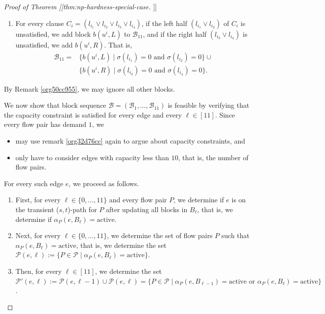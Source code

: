 \documentclass[fontsize=11pt,paper=a4]{book}
\begin{document}
\begin{proof}[Proof of Theorem [[thm:np-hardness-special-case]]]
\begin{enumerate}
\item For every clause \(C_i=(l_{i_1}\vee l_{i_2}\vee l_{i_3}\vee l_{i_4})\), if the left half \((l_{i_1}\vee l_{i_2})\) of \(C_i\) is unsatisfied, we add block \(b(u^i,L)\) to \(\mathscr{B}_{11}\), and if the right half \((l_{i_3}\vee l_{i_4})\) is unsatisfied, we add \(b(u^i,R)\).
That is,
\begin{align*}
\mathscr{B}_{11}=&\{b(u^i,L)\mid\sigma(l_{i_1})=0\text{ and }\sigma(l_{i_2})=0\}\cup\\
&\{b(u^i,R)\mid\sigma(l_{i_3})=0\text{ and }\sigma(l_{i_4})=0\}.
\end{align*}
\end{enumerate}

By Remark \ref{org50cc955}, we may ignore all other blocks.

We now show that block sequence \(\mathcal{B}=(\mathscr{B}_1,\dots,\mathscr{B}_{11})\) is feasible by verifying that the capacity constraint is satisfied for every edge and every \(\ell\in[11]\).
Since every flow pair has demand \(1\), we

\begin{itemize}
\item may use remark \ref{org32d76cc} again to argue about capacity constraints, and

\item only have to consider edges with capacity less than \(10\), that is, the number of flow pairs.
\end{itemize}


For every such edge \(e\), we proceed as follows.

\begin{enumerate}
\item First, for every \(\ell\in\{0,\dots,11\}\) and every flow pair \(P\), we determine if \(e\) is on the transient (\(s,t\))-path for \(P\) after updating all blocks in \(B_{\ell}\), that is, we determine if \(\alpha_P(e,B_{\ell})=\mathrm{active}\).

\item Next, for every \(\ell\in\{0,\dots,11\}\), we determine the set of flow pairs \(P\) such that \(\alpha_P(e,B_{\ell})=\mathrm{active}\), that is, we determine the set \(\mathcal{P}(e,\ell):=\{P\in\mathcal{P}\mid\alpha_P(e,B_{\ell})=\mathrm{active}\}\).

\item Then, for every \(\ell\in[11]\), we determine the set \(\mathcal{P}'(e,\ell):=\mathcal{P}(e,\ell-1)\cup\mathcal{P}(e,\ell)=\{P\in\mathcal{P}\mid\alpha_P(e,B_{\ell-1})=\mathrm{active}\text{ or }\alpha_P(e,B_{\ell})=\mathrm{active}\}\).


\end{enumerate}
\end{proof}
\end{document}
